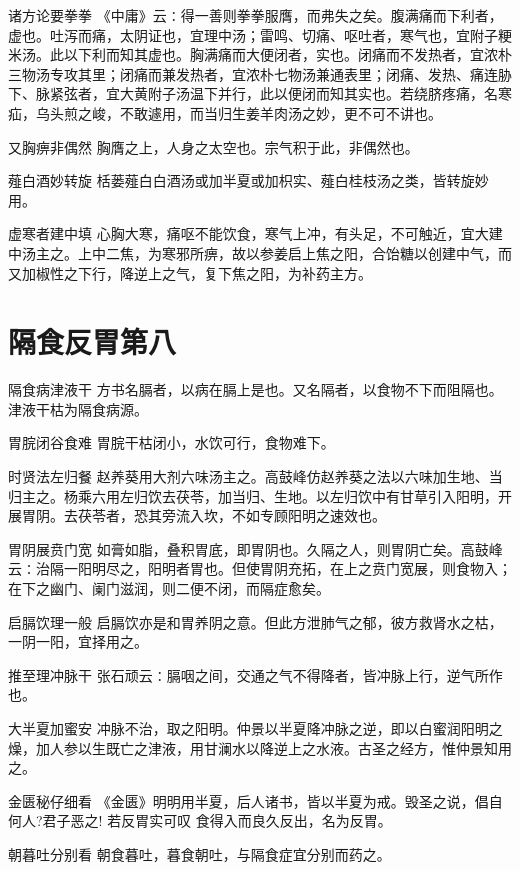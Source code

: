 \documentclass[a4paper,12pt,UTF8,twoside]{ctexbook}
\begin{document}
  诸方论要拳拳
  《中庸》云∶得一善则拳拳服膺，而弗失之矣。腹满痛而下利者，虚也。吐泻而痛，太阴证也，宜理中汤；雷鸣、切痛、呕吐者，寒气也，宜附子粳米汤。此以下利而知其虚也。胸满痛而大便闭者，实也。闭痛而不发热者，宜浓朴三物汤专攻其里；闭痛而兼发热者，宜浓朴七物汤兼通表里；闭痛、发热、痛连胁下、脉紧弦者，宜大黄附子汤温下并行，此以便闭而知其实也。若绕脐疼痛，名寒疝，乌头煎之峻，不敢遽用，而当归生姜羊肉汤之妙，更不可不讲也。
    
  又胸痹非偶然
  胸膺之上，人身之太空也。宗气积于此，非偶然也。
    
  薤白酒妙转旋
  栝蒌薤白白酒汤或加半夏或加枳实、薤白桂枝汤之类，皆转旋妙用。
    
  虚寒者建中填
  心胸大寒，痛呕不能饮食，寒气上冲，有头足，不可触近，宜大建中汤主之。上中二焦，为寒邪所痹，故以参姜启上焦之阳，合饴糖以创建中气，而又加椒性之下行，降逆上之气，复下焦之阳，为补药主方。
        
  \section{隔食反胃第八}
    隔食病津液干
    方书名膈者，以病在膈上是也。又名隔者，以食物不下而阻隔也。津液干枯为隔食病源。
    
    胃脘闭谷食难
    胃脘干枯闭小，水饮可行，食物难下。
    
    时贤法左归餐
    赵养葵用大剂六味汤主之。高鼓峰仿赵养葵之法以六味加生地、当归主之。杨乘六用左归饮去茯苓，加当归、生地。以左归饮中有甘草引入阳明，开展胃阴。去茯苓者，恐其旁流入坎，不如专顾阳明之速效也。
    
    胃阴展贲门宽
    如膏如脂，叠积胃底，即胃阴也。久隔之人，则胃阴亡矣。高鼓峰云∶治隔一阳明尽之，阳明者胃也。但使胃阴充拓，在上之贲门宽展，则食物入；在下之幽门、阑门滋润，则二便不闭，而隔症愈矣。
    
    启膈饮理一般
    启膈饮亦是和胃养阴之意。但此方泄肺气之郁，彼方救肾水之枯，一阴一阳，宜择用之。
    
    推至理冲脉干
    张石顽云∶膈咽之间，交通之气不得降者，皆冲脉上行，逆气所作也。
    
    大半夏加蜜安
    冲脉不治，取之阳明。仲景以半夏降冲脉之逆，即以白蜜润阳明之燥，加人参以生既亡之津液，用甘澜水以降逆上之水液。古圣之经方，惟仲景知用之。
    
    金匮秘仔细看
    《金匮》明明用半夏，后人诸书，皆以半夏为戒。毁圣之说，倡自何人?君子恶之!
    若反胃实可叹
    食得入而良久反出，名为反胃。
    
    朝暮吐分别看
    朝食暮吐，暮食朝吐，与隔食症宜分别而药之。
    
\end{document}
